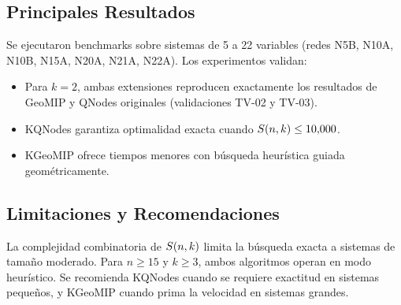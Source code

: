 \subsection{Principales Resultados}

Se ejecutaron benchmarks sobre sistemas de 5 a 22 variables (redes N5B, N10A, N10B, N15A, N20A, N21A, N22A). Los experimentos validan:

\begin{itemize}[itemsep=4pt]
    \item Para $k = 2$, ambas extensiones reproducen exactamente los resultados de GeoMIP y QNodes originales (validaciones TV-02 y TV-03).
    \item KQNodes garantiza optimalidad exacta cuando $S(n,k) \leq 10{,}000$.
    \item KGeoMIP ofrece tiempos menores con búsqueda heurística guiada geométricamente.
\end{itemize}

\subsection{Limitaciones y Recomendaciones}

La complejidad combinatoria de $S(n,k)$ limita la búsqueda exacta a sistemas de tamaño moderado. Para $n \geq 15$ y $k \geq 3$, ambos algoritmos operan en modo heurístico. Se recomienda KQNodes cuando se requiere exactitud en sistemas pequeños, y KGeoMIP cuando prima la velocidad en sistemas grandes.
